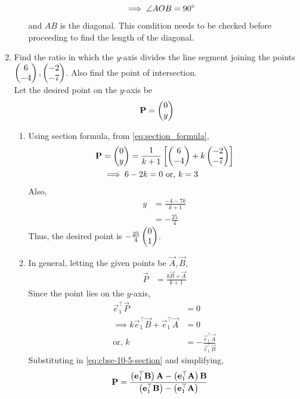 \documentclass[journal,12pt,twocolumn]{IEEEtran}
\renewcommand\thesection{\arabic{section}}
\begin{document}
\begin{enumerate}[label=\thesection.\arabic*.,ref=\thesection.\theenumi]
\begin{enumerate}
\begin{align}
	  \\
	  \implies \angle AOB &= 90\degree
  \end{align}
  and $AB$ is the diagonal.
This condition needs to be checked before proceeding to find the length of the diagonal.
\end{enumerate}
	\item  Find the ratio in which the $y$-axis divides the line segment joining the points $\begin{pmatrix}6 \\ -4\end{pmatrix}, \begin{pmatrix}-2 \\ -7\end{pmatrix} $.  Also find the point of intersection.
		\\
		\solution  Let the desired point on the $y$-axis be  
		\begin{align}
\mathbf{P} = \begin{pmatrix}0 \\ y\end{pmatrix}
		\end{align}
		\begin{enumerate}
		\item Using section formula, 
	  from \eqref{eq:section_formula},
		\begin{align}
			\mathbf{P} &= \begin{pmatrix}0 \\ y\end{pmatrix}= \frac{1}{k+1}{}\left[\begin{pmatrix}6 \\ -4\end{pmatrix}+ k\begin{pmatrix}-2 \\ -7\end{pmatrix} \right]
			\\
			&	\implies 6 - 2k = 0 \text{ or, }k = 3
		\end{align}
		Also, 
		\begin{align}
			y &= \frac{-4-7k}{k+1}
			\\
			&=-\frac{25}{4}
		\end{align}
		Thus, the desired point is  $ -\frac{25}{4}
\begin{pmatrix}0 \\ 1 \end{pmatrix}$.
\item In general, letting the given points be $\vec{A}, \vec{B}$, 
		\begin{align}
			\vec{P} &= \frac{k\vec{B}+ \vec{A} }{k+1}
			\label{eq:cbse-10-5-section}
		\end{align}
		Since the point lies on the $y$-axis, 
		\begin{align}
			\vec{e}_1^{\top}\vec{P} &= 0
			\\
			\implies k\vec{e}_1^{\top}\vec{B}+ \vec{e}_1^{\top}\vec{A} &=0
			\\
			\text{or, } k &=- \frac{\vec{e}_1^{\top}\vec{A}}{\vec{e}_1^{\top}\vec{B}}
		\end{align}
Substituting in 			\eqref{eq:cbse-10-5-section} and simplifying, 
		\begin{align}
			\vec{P} &= \frac{\brak{\vec{e}_1^{\top}\vec{B}}\vec{A}- \brak{\vec{e}_1^{\top}\vec{A}}\vec{B} }{\brak{\vec{e}_1^{\top}\vec{B}}-\brak{\vec{e}_1^{\top}\vec{A}}}

\end{align}
\end{enumerate}
\end{enumerate}
\end{document}
